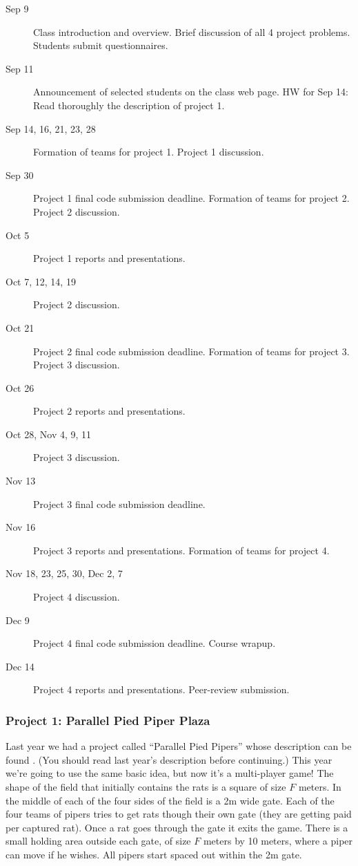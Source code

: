 \begin{description}
\item[Sep 9] Class introduction and overview.
Brief discussion of all 4 project problems.  Students submit questionnaires.
\item[Sep 11] Announcement of selected students on the class web page.
HW for Sep 14: Read thoroughly the description of project 1.
\item[Sep 14, 16, 21, 23, 28] 
Formation of teams for project 1.
Project 1 discussion.
\item[Sep 30] Project 1 final code submission deadline.
Formation of teams for project 2.
Project 2 discussion.
\item[Oct 5] Project 1 reports and presentations.
\item[Oct 7, 12, 14, 19] Project 2 discussion.
\item[Oct 21] Project 2 final code submission deadline.
Formation of teams for project 3.
Project 3 discussion.
\item[Oct 26] Project 2 reports and presentations.
\item[Oct 28, Nov 4, 9, 11] Project 3 discussion.
\item[Nov 13] Project 3 final code submission deadline. 
\item[Nov 16] Project 3 reports and presentations. Formation of teams for project 4.
\item[Nov 18, 23, 25, 30, Dec 2, 7] Project 4 discussion.
\item[Dec 9] Project 4 final code submission deadline. Course wrapup.
\item[Dec 14] Project 4 reports and presentations. Peer-review submission. 
\end{description}

\subsubsection{Project 1: Parallel Pied Piper Plaza}
Last year we had a project called ``Parallel Pied Pipers'' whose
description can be found
.
(You should read last year's description before continuing.)
This year we're going to use the same basic idea, but now it's a
multi-player game!  The shape of the field that initially contains the
rats is a square of size $F$ meters.  In the middle of each of the
four sides of the field is a 2m wide gate.  Each of the four teams of
pipers tries to get rats though their own gate (they are getting paid
per captured rat).  Once a rat goes through the gate it exits the
game.  There is a small holding area outside each gate, of size $F$
meters by 10 meters, where a piper can move if he wishes.  All pipers start
spaced out within the 2m gate.

